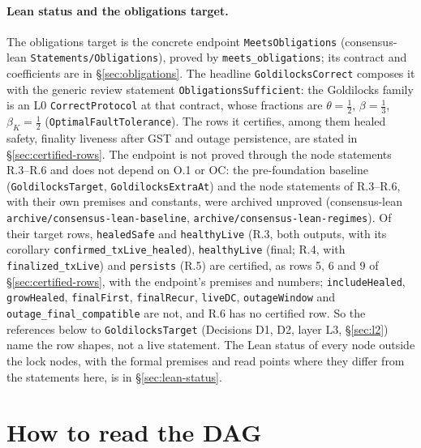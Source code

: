 \documentclass{article}
\begin{document}
\begin{sloppypar}
\paragraph{Lean status and the obligations target.}  The
obligations target is the concrete endpoint
\texttt{MeetsObligations} (consensus-lean
\texttt{Statements/Obligations}), proved by
\texttt{meets\_obligations}; its contract and coefficients are in
\S\ref{sec:obligations}.  The headline \texttt{GoldilocksCorrect}
composes it with the generic review statement
\texttt{ObligationsSufficient}: the Goldilocks family is an L0
\texttt{CorrectProtocol} at that contract, whose fractions are
$\theta=\tfrac12$, $\beta=\tfrac13$, $\beta_K=\tfrac12$
(\texttt{OptimalFaultTolerance}).  The rows it certifies, among
them healed safety, finality liveness after GST and outage persistence,
are stated in \S\ref{sec:certified-rows}.  The endpoint is not proved
through the node statements R.3--R.6 and does not depend on O.1 or OC: the
pre-foundation baseline (\texttt{GoldilocksTarget},
\texttt{GoldilocksExtraAt}) and the node statements of R.3--R.6, with their
own premises and constants, were archived unproved (consensus-lean
\texttt{archive/consensus-lean-baseline},
\texttt{archive/consensus-lean-regimes}).  Of their target rows,
\texttt{healedSafe} and \texttt{healthyLive} (R.3, both outputs, with
its corollary \texttt{confirmed\_txLive\_healed}), \texttt{healthyLive}
(final; R.4, with \texttt{finalized\_txLive}) and \texttt{persists} (R.5)
are certified, as rows 5, 6 and 9 of \S\ref{sec:certified-rows}, with the
endpoint's premises and numbers; \texttt{includeHealed},
\texttt{growHealed}, \texttt{finalFirst}, \texttt{finalRecur},
\texttt{liveDC}, \texttt{outageWindow} and \texttt{outage\_final\_compatible}
are not, and R.6 has no certified row.  So the references below to
\texttt{GoldilocksTarget} (Decisions D1, D2, layer L3, \S\ref{sec:l2}) name
the row shapes, not a live statement.  The Lean status of every node outside the lock nodes, with the
formal premises and read points where they differ from the statements here,
is in \S\ref{sec:lean-status}.
\end{sloppypar}

\section{How to read the DAG}\label{sec:dag-rules}
\end{document}
